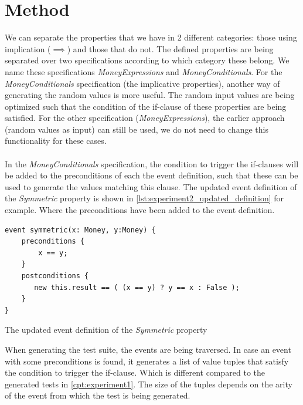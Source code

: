 \section{Method}
We can separate the properties that we have in 2 different categories: those using implication ($\implies$) and those that do not. The defined properties are being separated over two specifications according to which category these belong. We name these specifications \textit{MoneyExpressions} and \textit{MoneyConditionals}. For the \textit{MoneyConditionals} specification (the implicative properties), another way of generating the random values is more useful. The random input values are being optimized such that the condition of the if-clause of these properties are being satisfied. For the other specification (\textit{MoneyExpressions}), the earlier approach (random values as input) can still be used, we do not need to change this functionality for these cases.\\
\\
In the \textit{MoneyConditionals} specification, the condition to trigger the if-clauses will be added to the preconditions of each the event definition, such that these can be used to generate the values matching this clause. The updated event definition of the \textit{Symmetric} property is shown in \autoref{lst:experiment2_updated_definition} for example. Where the preconditions have been added to the event definition.
\FloatBarrier
\begin{sourcecode}[!ht]
\begin{lstlisting}[language=Rebel]
event symmetric(x: Money, y:Money) {
    preconditions {
        x == y;
    }
    postconditions {
       new this.result == ( (x == y) ? y == x : False );
    }
}
\end{lstlisting}
\caption{The updated event definition of the \textit{Symmetric} property}
\label{lst:experiment2_updated_definition}
\end{sourcecode}
\FloatBarrier
When generating the test suite, the events are being traversed. In case an event with some preconditions is found, it generates a list of value tuples that satisfy the condition to trigger the if-clause. Which is different compared to the generated tests in \autoref{cpt:experiment1}. The size of the tuples depends on the arity of the event from which the test is being generated.\\
\\
